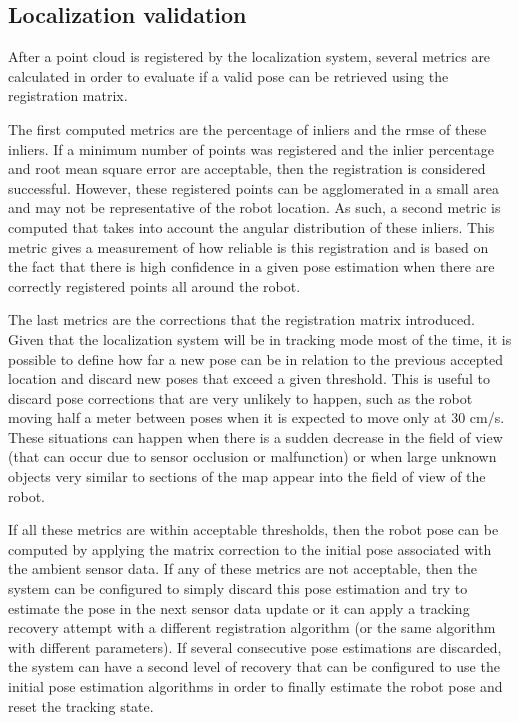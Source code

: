 \subsection{Localization validation}

After a point cloud is registered by the localization system, several metrics are calculated in order to evaluate if a valid pose can be retrieved using the registration matrix.

The first computed metrics are the percentage of inliers and the \gls{rmse} of these inliers. If a minimum number of points was registered and the inlier percentage and root mean square error are acceptable, then the registration is considered successful. However, these registered points can be agglomerated in a small area and may not be representative of the robot location. As such, a second metric is computed that takes into account the angular distribution of these inliers. This metric gives a measurement of how reliable is this registration and is based on the fact that there is high confidence in a given pose estimation when there are correctly registered points all around the robot.

The last metrics are the corrections that the registration matrix introduced. Given that the localization system will be in tracking mode most of the time, it is possible to define how far a new pose can be in relation to the previous accepted location and discard new poses that exceed a given threshold. This is useful to discard pose corrections that are very unlikely to happen, such as the robot moving half a meter between poses when it is expected to move only at 30 cm/s. These situations can happen when there is a sudden decrease in the field of view (that can occur due to sensor occlusion or malfunction) or when large unknown objects very similar to sections of the map appear into the field of view of the robot.

If all these metrics are within acceptable thresholds, then the robot pose can be computed by applying the matrix correction to the initial pose associated with the ambient sensor data. If any of these metrics are not acceptable, then the system can be configured to simply discard this pose estimation and try to estimate the pose in the next sensor data update or it can apply a tracking recovery attempt with a different registration algorithm (or the same algorithm with different parameters). If several consecutive pose estimations are discarded, the system can have a second level of recovery that can be configured to use the initial pose estimation algorithms in order to finally estimate the robot pose and reset the tracking state.


